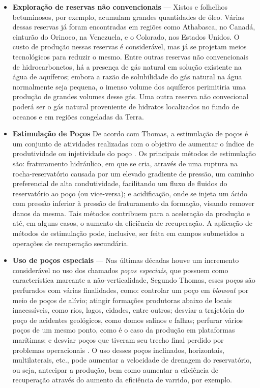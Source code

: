 \begin{itemize}
\item \textbf{Exploração de reservas não convencionais} --- Xistos e folhelhos betuminosos, por exemplo, acumulam grandes quantidades de óleo. Várias dessas reservas já foram encontradas em regiões como Athabasca, no Canadá, cinturão do Orinoco, na Venezuela, e o Colorado, nos Estados Unidos. O custo de produção nessas reservas é considerável, mas já se projetam meios tecnológicos para reduzir o mesmo. Entre outras reservas não convencionais de hidrocarbonetos, há a presença de gás natural em solução existente na água de aquíferos; embora a razão de solubilidade do gás natural na água normalmente seja pequena, o imenso volume dos aquíferos perimitiria uma produção de grandes volumes desse gás. Uma outra reserva não convecional poderá ser o gás natural proveniente de hidratos localizados no fundo de oceanos e em regiões congeladas da Terra.
\item \textbf{Estimulação de Poços} De acordo com Thomas, a estimulação de poços é um conjunto de atividades realizadas com o objetivo de aumentar o índice de produtividade ou injetividade do poço \cite[p.~166]{engpetro}. Os principais métodos de estimulação são: fraturamento hidráulico, em que se cria, através de uma ruptura na rocha-reservatório causada por um elevado gradiente de pressão, um caminho preferencial de alta condutividade, facilitando um fluxo de fluidos do reservatório ao poço (ou vice-versa); e acidificação, onde se injeta um ácido com pressão inferior à pressão de fraturamento da formação, visando remover danos da mesma. Tais métodos contribuem para a aceleração da produção e até, em alguns casos, o aumento da eficiência de recuperação. A aplicação de métodos de estimulação pode, inclusive, ser feita em campos submetidos a operações de recuperação secundária.
\item \textbf{Uso de poços especiais} --- Nas últimas décadas houve um incremento considerável no uso dos chamados \textit{poços especiais}, que possuem como característica marcante a não-verticalidade, Segundo Thomas, esses poços são perfurados com várias finalidades, como: controlar um poço em \textit{blowout} por meio de poços de alívio; atingir formações produtoras abaixo de locais inacessíveis, como rios, lagos, cidades, entre outros; desviar a trajetória do poço de acidentes geológicos, como domos salinos e falhas; perfurar vários poços de um mesmo ponto, como é o caso da produção em plataformas marítimas; e desviar poços que tiveram seu trecho final perdido por problemas operacionais \cite[p.~106]{engpetro}. O uso desses poços inclinados, horizontais, multilaterais, etc., pode aumentar a velocidade de drenagem do reservatório, ou seja, antecipar a produção, bem como aumentar a eficiência de recuperação através do aumento da eficiência de varrido, por exemplo.

\end{itemize}
